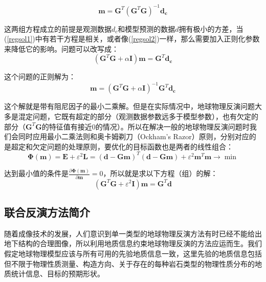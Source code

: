 \begin{equation}
    \mathbf{m}=\mathbf{G}^T(\mathbf{G}^T\mathbf{G})^{-1}\mathbf{d_c}
    \label{regsol2}
\end{equation}

这两组方程成立的前提是观测数据$d_c$和模型预测的数据$d$拥有极小的方差，当(\ref{regsol1})中有若干方程是相关，或者像(\ref{regsol2})一样，那么需要加入正则化参数来降低它的影响。问题可以改写成：
\begin{equation}
    (\mathbf{G}^T\mathbf{G}+\alpha \mathbf{I})\mathbf{m}=\mathbf{G}^T\mathbf{d_c}
    \label{eq25}
\end{equation}

这个问题的正则解为： 
\begin{equation}
    \mathbf{m}=(\mathbf{G}^T\mathbf{G}+\alpha \mathbf{I})^{-1}\mathbf{G}^T\mathbf{d_c}
    \label{eq26}
\end{equation}

这个解就是带有阻尼因子的最小二乘解。但是在实际情况中，地球物理反演问题大多是混定问题，它既有超定的部分（观测数据参数远多于模型参数），也有欠定的部分（$\mathbf{G}^T\mathbf{G}$的特征值有接近0的情况）。所以在解决一般的地球物理反演问题时我们会同时应用最小二乘法则和奥卡姆剃刀（Ockham's Razor）原则，分别对应的是超定和欠定问题的处理原则，要优化的目标函数也是两者的线性组合：
\begin{equation}
    \mathbf{\Phi}(\mathbf{m})=\mathbf{E}+\varepsilon^2\mathbf{L}=(\mathbf{d-Gm})^T(\mathbf{d-Gm})+\varepsilon^2\mathbf{m}^T\mathbf{m}\to\min
    \label{eq27}
\end{equation}

达到最小值的条件是$\frac{\partial \mathbf{\Phi}(\mathbf{m})}{\partial\mathbf{m}}=0$，所以就是求以下方程（组）的解：
\begin{equation}
    (\mathbf{G}^T\mathbf{G}+\varepsilon^2\mathbf{I})\mathbf{m}=\mathbf{G}^T\mathbf{d}
    \label{eq28}
\end{equation}

\subsection{联合反演方法简介}

随着成像技术的发展，人们意识到单一类型的地球物理反演方法有时已经不能给出地下结构的合理图像，所以利用地质信息约束地球物理反演的方法应运而生。我们假定地球物理模型应该与所有可用的先验地质信息一致，这里先验的地质信息包括但不限于物理性质测量、构造方向、关于存在的每种岩石类型的物理性质分布的地质统计信息、目标的预期形状。

